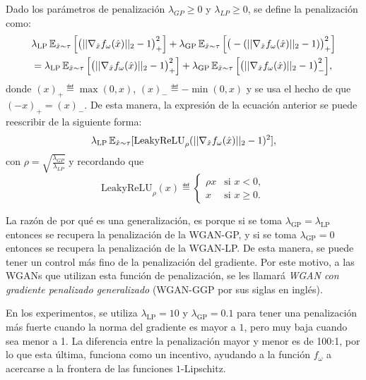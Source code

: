 Dado los parámetros de penalización $\lambda_{GP} \geq 0$ y $\lambda_{LP} \geq 0$, se define la penalización como:
\begin{align*}
     & \lambda_{\mathrm{LP}} \Exp_{\hat x \sim \tau} \Big[\big(||\nabla_{\hat x} f_{\omega}(\hat x)||_2 - 1\big)_{+}^2\Big]
    + \lambda_{\mathrm{GP}} \Exp_{\hat x \sim \tau} \Big[\big( - (||\nabla_{\hat x} f_{\omega}(\hat x)||_2 - 1)\big)_{+}^2\Big] \\
     & =  \lambda_{\mathrm{LP}} \Exp_{\hat x \sim \tau} \Big[\big(||\nabla_{\hat x} f_{\omega}(\hat x)||_2 - 1\big)_{+}^2\Big]
    + \lambda_{\mathrm{GP}} \Exp_{\hat x \sim \tau} \Big[\big( ||\nabla_{\hat x} f_{\omega}(\hat x)||_2 - 1 \big)_{-}^2\Big],
\end{align*}
donde $(x)_{+} \eqdef \max(0, x)$, $(x)_{-} \eqdef -\min(0, x)$ y se usa el hecho de que $(-x)_{+} = (x)_{-}$. De esta manera, la expresión de la ecuación anterior se puede reescribir de la siguiente forma:
\begin{equation}
    \lambda_{\mathrm{LP}} \Exp_{\hat x \sim \tau} [\mathrm{LeakyReLU}_{\rho}(||\nabla_{\hat x} f_{\omega}(\hat x)||_2 - 1)^2],
\end{equation}
con $\rho = \sqrt{\frac{\lambda_{GP}}{\lambda_{LP}}}$ y recordando que
\begin{equation}
    \mathrm{LeakyReLU}_{\rho} (x) \eqdef \begin{cases}
        \rho x & \text{si } x < 0,    \\
        x      & \text{si } x \geq 0.
    \end{cases}
\end{equation}

La razón de por qué es una generalización, es porque si se toma $\lambda_{\mathrm{GP}} = \lambda_{\mathrm{LP}}$ entonces se recupera la penalización de la WGAN-GP, y si se toma $\lambda_{\mathrm{GP}} = 0$ entonces se recupera la penalización de la WGAN-LP. De esta manera, se puede tener un control más fino de la penalización del gradiente. Por este motivo, a las WGANs que utilizan esta función de penalización, se les llamará \textit{WGAN con gradiente penalizado generalizado} (WGAN-GGP por sus siglas en inglés).

En los experimentos, se utiliza $\lambda_{\mathrm{LP}} = 10$ y $\lambda_{\mathrm{GP}} = 0.1$ para tener una penalización más fuerte cuando la norma del gradiente es mayor a $1$, pero muy baja cuando sea menor a 1. La diferencia entre la penalización mayor y menor es de 100:1, por lo que esta última, funciona como un incentivo, ayudando a la función $f_\omega$ a acercarse a la frontera de las funciones $1$-Lipschitz.

